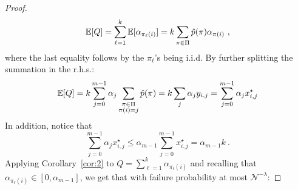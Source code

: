 \documentclass[letterpaper]{article} %
\theoremstyle{definition}
\newcommand{\NN}{\mathcal{N}}
\newcommand{\EE}{\mathbb{E}}
\begin{document}
\begin{proof}
\begin{equation*}
\EE[Q] = \sum_{\ell=1}^{k} \EE[\alpha_{\pi_{\ell}(i)}]\\
=k \sum_{\pi \in \Pi} \hat{p}(\pi)\alpha_{\pi(i)}\ ,
\end{equation*}
where the last equality follows by the $\pi_{\ell}$'s being i.i.d. By further splitting the summation in the r.h.s.:
\begin{equation*}
\EE[Q] =  k \sum_{j=0}^{m-1} \alpha_{j}\sum_{\substack{{\pi \in \Pi}\\\pi(i)=j }} \hat{p}(\pi)\\
=  k \sum_j \alpha_{j} y_{i,j}\\
=  \sum_{j=0}^{m-1} \alpha_{j} x^\star_{i,j}\\
\end{equation*}
	In addition, notice that
	\begin{equation}\label{eq:tttt}
		\sum_{j=0}^{m-1} \alpha_{j} x^\star_{i,j} \leq \alpha_{m-1}\sum_{j=0}^{m-1}x^\star_{i,j}= \alpha_{m-1}k\ .
	\end{equation}
	Applying Corollary~\ref{cor:2} to $Q=\sum_{\ell=1}^{k}\alpha_{\pi_{\ell}(i)}$ and recalling that $\alpha_{\pi_{\ell}(i)} \in [0,\alpha_{m-1}]$, we get that with   failure probability at most $\NN^{-\lambda}$:

\end{proof}
\end{document}
